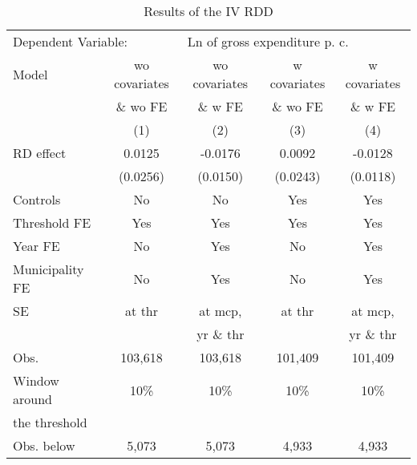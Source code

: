 
\begin{table}
   \caption{\label{tab:rdd_iv} Results of the \acs{IV} \acs{RDD}}
   \centering
   \begin{tabular}{lcccc}
      \toprule \midrule
      \multicolumn{2}{l}{Dependent Variable:} & \multicolumn{3}{l}{Ln of gross expenditure p. c.}\\
      Model & \acs{wo} covariates & \acs{wo} covariates & \acs{w} covariates & \acs{w} covariates \\ 
       &  \& \acs{wo} \ac{FE} &   \& \acs{w} \ac{FE} &  \& \acs{wo} \ac{FE} &  \& \acs{w} \ac{FE} \\ 
                                         & (1)      & (2)      & (3)      & (4)\\  
      \midrule
      \ac{RD} effect                             & 0.0125   & -0.0176  & 0.0092   & -0.0128\\   
                                               & (0.0256) & (0.0150) & (0.0243) & (0.0118)\\   
      \midrule
      Controls                                 & No       & No       & Yes      & Yes\\  
      Threshold \ac{FE}    & Yes      & Yes      & Yes      & Yes\\  
      Year \ac{FE}                             & No         & Yes      & No         & Yes\\  
      Municipality \ac{FE}                              & No         & Yes      & No         & Yes\\  
      \acs{SE} & at \acs{thr} & at \acs{mcp}, & at \acs{thr} & at \acs{mcp},\\
       & & \acs{yr} \& \acs{thr} & & \acs{yr} \& \acs{thr} \\
      \midrule
      \acs{Obs.}                             & 103,618  & 103,618  & 101,409  & 101,409\\  
      Window around              & 10\%     & 10\%     & 10\%     & 10\%\\ 
      \hspace{5mm} the threshold &&&& \\  
      \acs{Obs.} below                       & 5,073    & 5,073    & 4,933    & 4,933\\  

\end{tabular}
\end{table}
